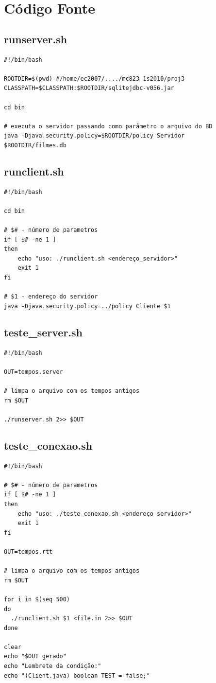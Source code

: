 \documentclass[11pt,twoside]{article}
\begin{document}
\section{Código Fonte}

\subsection{runserver.sh}  %
\begin{verbatim}
#!/bin/bash

ROOTDIR=$(pwd) #/home/ec2007/..../mc823-1s2010/proj3
CLASSPATH=$CLASSPATH:$ROOTDIR/sqlitejdbc-v056.jar

cd bin

# executa o servidor passando como parâmetro o arquivo do BD
java -Djava.security.policy=$ROOTDIR/policy Servidor $ROOTDIR/filmes.db
\end{verbatim}


\subsection{runclient.sh} %
\begin{verbatim}
#!/bin/bash

cd bin

# $# - número de parametros 
if [ $# -ne 1 ]
then
    echo "uso: ./runclient.sh <endereço_servidor>"
    exit 1
fi

# $1 - endereço do servidor
java -Djava.security.policy=../policy Cliente $1
\end{verbatim}


\subsection{teste_server.sh} %
\begin{verbatim}
#!/bin/bash

OUT=tempos.server

# limpa o arquivo com os tempos antigos
rm $OUT

./runserver.sh 2>> $OUT
\end{verbatim}


\subsection{teste_conexao.sh}     %
\begin{verbatim}
#!/bin/bash

# $# - número de parametros 
if [ $# -ne 1 ]
then
    echo "uso: ./teste_conexao.sh <endereço_servidor>"
    exit 1
fi

OUT=tempos.rtt

# limpa o arquivo com os tempos antigos
rm $OUT

for i in $(seq 500)
do
  ./runclient.sh $1 <file.in 2>> $OUT
done

clear
echo "$OUT gerado"
echo "Lembrete da condição:"
echo "(Client.java) boolean TEST = false;"
\end{verbatim}
\end{document}
